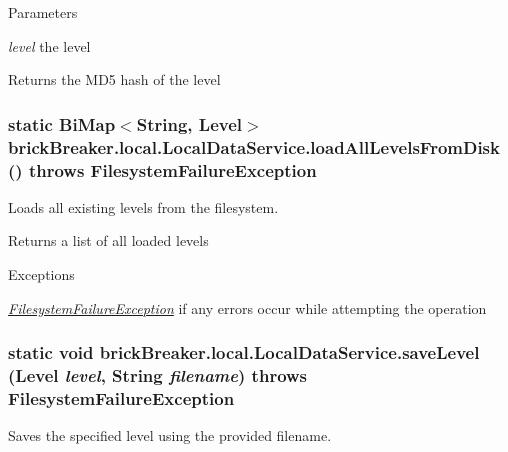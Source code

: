 \begin{DoxyParams}{Parameters}
\item[{\em level}]the level \end{DoxyParams}
\begin{DoxyReturn}{Returns}
the MD5 hash of the level 
\end{DoxyReturn}
\hypertarget{classbrick_breaker_1_1local_1_1_local_data_service_a498aa81a0d3ac82f0818dd9e3df6ee3d}{
\subsubsection[{loadAllLevelsFromDisk}]{\setlength{\rightskip}{0pt plus 5cm}static BiMap$<$String, {\bf Level}$>$ brickBreaker.local.LocalDataService.loadAllLevelsFromDisk ()  throws {\bf FilesystemFailureException} }}
\label{classbrick_breaker_1_1local_1_1_local_data_service_a498aa81a0d3ac82f0818dd9e3df6ee3d}
Loads all existing levels from the filesystem.

\begin{DoxyReturn}{Returns}
a list of all loaded levels
\end{DoxyReturn}

\begin{DoxyExceptions}{Exceptions}
\item[{\em \hyperlink{classbrick_breaker_1_1local_1_1_filesystem_failure_exception}{FilesystemFailureException}}]if any errors occur while attempting the operation \end{DoxyExceptions}
\hypertarget{classbrick_breaker_1_1local_1_1_local_data_service_a01f5a08e38cd865add34f24a7634cf38}{
\subsubsection[{saveLevel}]{\setlength{\rightskip}{0pt plus 5cm}static void brickBreaker.local.LocalDataService.saveLevel ({\bf Level} {\em level}, \/  String {\em filename})  throws {\bf FilesystemFailureException} }}
\label{classbrick_breaker_1_1local_1_1_local_data_service_a01f5a08e38cd865add34f24a7634cf38}
Saves the specified level using the provided filename.


